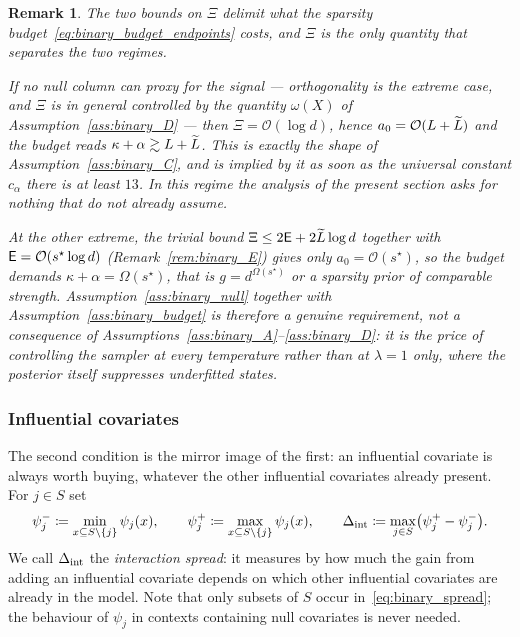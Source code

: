\documentclass[aos]{imsart}%
\newcommand{\OO}{\mathcal{O}}  %
\theoremstyle{plain}
\newtheorem{remark}{Remark}[section]
\theoremstyle{definition}
\begin{document}
    \begin{remark}
        \label{rem:binary_proxy}
        The two bounds on $\Xi$ delimit what the sparsity
        budget~\eqref{eq:binary_budget_endpoints} costs, and $\Xi$ is the only
        quantity that separates the two regimes.

        If no null column can proxy for the signal --- orthogonality is the
        extreme case, and $\Xi$ is in general controlled by the quantity
        $\omega(X)$ of Assumption~\ref{ass:binary_D} --- then
        $\Xi=\OO(\log d)$, hence $a_0=\OO(L+\Ltil)$ and the budget reads
        $\kappa+\alpha\gtrsim L+\widetilde{L}$. This is exactly the shape of
        Assumption~\ref{ass:binary_C}, and is implied by it as soon as the
        universal constant $c_\alpha$ there is at least $13$. In this regime
        the analysis of the present section asks for nothing that
        \citet{YangWainwrightJordan2016} do not already assume.

        At the other extreme, the trivial bound
        $\Xi\leq2\mathsf{E}+2\widetilde{L}\log d$ together with
        $\Energy=\OO(s^{\star}\log d)$ (Remark~\ref{rem:binary_E}) gives only
        $a_0=\OO(s^{\star})$, so the budget demands
        $\kappa+\alpha=\Omega(s^{\star})$, that is $g=d^{\Omega(s^{\star})}$
        or a sparsity prior of comparable strength. Assumption~\ref{ass:binary_null}
        together with Assumption~\ref{ass:binary_budget} is therefore a genuine
        requirement, not a consequence of
        Assumptions~\ref{ass:binary_A}--\ref{ass:binary_D}: it is the price of
        controlling the sampler at \emph{every} temperature rather than at
        $\lambda=1$ only, where the posterior itself suppresses underfitted
        states.
    \end{remark}

    \subsubsection{Influential covariates}

    The second condition is the mirror image of the first: an influential
    covariate is always worth buying, whatever the other influential covariates
    already present. For $j\in S$ set
    \begin{equation}
        \label{eq:binary_spread}
        \psi_j^{-}\coloneq\min_{x\subseteq S\setminus\{j\}}\psi_j(x),
        \qquad
        \psi_j^{+}\coloneq\max_{x\subseteq S\setminus\{j\}}\psi_j(x),
        \qquad
        \Delta_{\mathrm{int}}\coloneq\max_{j\in S}\bigl(\psi_j^{+}-\psi_j^{-}\bigr).
    \end{equation}
    We call $\Delta_{\mathrm{int}}$ the \emph{interaction spread}: it measures by how much
    the gain from adding an influential covariate depends on which other
    influential covariates are already in the model. Note that only subsets of
    $S$ occur in~\eqref{eq:binary_spread}; the behaviour of $\psi_j$ in
    contexts containing null covariates is never needed.
\end{document}

